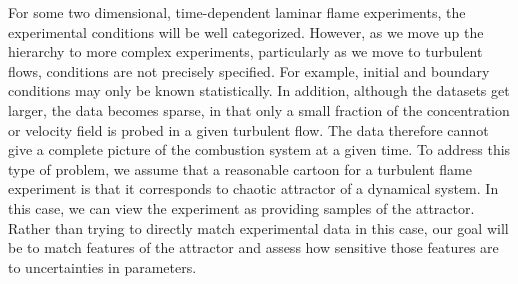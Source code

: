\documentclass[11pt]{article}
\begin{document}
For some two dimensional, time-dependent laminar flame experiments, the
experimental conditions will be well categorized. However,
as we move up the hierarchy to more complex experiments, particularly
as we move to turbulent flows, conditions are not precisely specified.
For example, initial and boundary conditions may only be known statistically.
In addition, although the datasets
get larger, the data becomes sparse, in that only a small fraction
of the concentration or velocity field is probed in a given turbulent
flow.
The data therefore cannot give a complete picture of the
combustion system at a given time.
To address this type of problem, we assume that
a reasonable cartoon for a turbulent flame experiment is that it
corresponds to chaotic attractor of a dynamical system.
In this case, we can view the experiment as 
providing samples of the attractor. 
Rather than trying to directly match experimental data in this case, our goal
will be to match features of the attractor and assess how sensitive
those features are to uncertainties in parameters.

\end{document}
